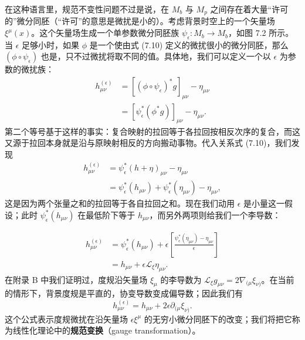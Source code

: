 在这种语言里，规范不变性问题不过是说，在 $M_{b}$ 与 $M_{p}$ 之间存在着大量“许可的”微分同胚（“许可”的意思是微扰是小的）。考虑背景时空上的一个矢量场 $\xi^{\mu}(x)$。这个矢量场生成一个单参数微分同胚族 $\psi_{\epsilon} : M_{b} \to M_{b}$，如图 7.2 所示。当 $\epsilon$ 足够小时，如果 $\phi$ 是一个使由式 (7.10) 定义的微扰很小的微分同胚，那么 $(\phi \circ \psi_{\epsilon})$ 也是，只不过微扰将取不同的值。具体地，我们可以定义一个以 $\epsilon$ 为参数的微扰族：
\begin{align*}
h^{(\epsilon)}_{\mu\nu} &= [(\phi \circ \psi_{\epsilon})^{*}g]_{\mu\nu} - \eta_{\mu\nu} \\
&= [\psi_{\epsilon}^{*}(\phi^{*}g)]_{\mu\nu} - \eta_{\mu\nu}.
\tag{7.11}
\end{align*}
第二个等号基于这样的事实：复合映射的拉回等于各拉回按相反次序的复合，而这又源于拉回本身就是沿与原映射相反的方向搬动事物。代入关系式 (7.10)，我们发现
\begin{align*}
h^{(\epsilon)}_{\mu\nu} &= \psi_{\epsilon}^{*}(h + \eta)_{\mu\nu} - \eta_{\mu\nu} \\
&= \psi_{\epsilon}^{*}(h_{\mu\nu}) + \psi_{\epsilon}^{*}(\eta_{\mu\nu}) - \eta_{\mu\nu},
\tag{7.12}
\end{align*}
这是因为两个张量之和的拉回等于各自拉回之和。现在我们动用 $\epsilon$ 是小量这一假设；此时 $\psi_{\epsilon}^{*}(h_{\mu\nu})$ 在最低阶下等于 $h_{\mu\nu}$，而另外两项则给我们一个李导数：

\begin{align*}
h^{(\epsilon)}_{\mu\nu} &= \psi_{\epsilon}^{*}(h_{\mu\nu}) + \epsilon\left[\frac{\psi_{\epsilon}^{*}(\eta_{\mu\nu}) - \eta_{\mu\nu}}{\epsilon}\right] \\
&= h_{\mu\nu} + \epsilon\mathcal{L}_{\xi}\eta_{\mu\nu}.
\tag{7.13}
\end{align*}
在附录 B 中我们证明过，度规沿矢量场 $\xi_{\mu}$ 的李导数为 $\mathcal{L}_{\xi}g_{\mu\nu} = 2\nabla_{(\mu}\xi_{\nu)}$。在当前的情形下，背景度规是平直的，协变导数变成偏导数；因此我们有
\begin{equation*}
\boxed{\,h^{(\epsilon)}_{\mu\nu} = h_{\mu\nu} + 2\epsilon\partial_{(\mu}\xi_{\nu)}.\,}
\tag{7.14}
\end{equation*}
这个公式表示度规微扰在沿矢量场 $\epsilon\xi^{\mu}$ 的无穷小微分同胚下的改变；我们将把它称为线性化理论中的\textbf{规范变换}（gauge transformation）。

